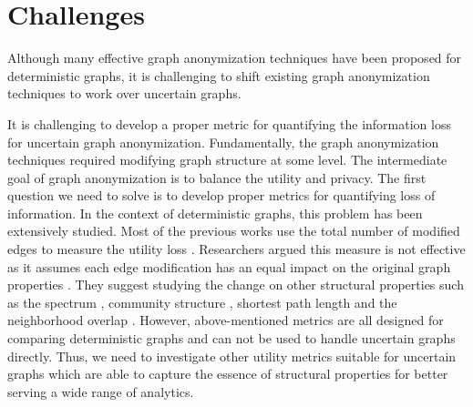 \vspace{-1em}
\section{Challenges}
\vspace{-1em}
\label{sec:challenges}
Although many effective graph anonymization techniques have been proposed for deterministic graphs, it is  challenging  to shift existing graph anonymization techniques to work over uncertain graphs.  

It is challenging to develop a proper metric for quantifying the information loss for uncertain graph anonymization. Fundamentally, the graph anonymization techniques required modifying graph structure at some level. The intermediate goal of graph anonymization is to balance the utility and privacy. The first question we need to solve is to develop proper metrics for quantifying loss of information. In the context of deterministic graphs, this problem has been extensively studied. Most of the previous works use the total number of modified edges to measure the utility loss \cite{Liu_Towards_2008,Boldi_Injecting_2012}. Researchers argued this measure is not effective as it assumes each edge modification has an equal impact on the original graph properties \cite{Wang2011}. They suggest studying the change on other structural properties such as the spectrum \cite{Ying_Randomizing_2008}, community structure \cite{Wang2011}, shortest path length and the neighborhood overlap \cite{Ninggal_Utility_2015}. However, above-mentioned metrics are all designed for comparing deterministic graphs and can not be used to handle uncertain graphs directly. Thus, we need to investigate other utility metrics suitable for uncertain graphs which are able to capture the essence of structural properties for better serving a wide range of analytics. 

